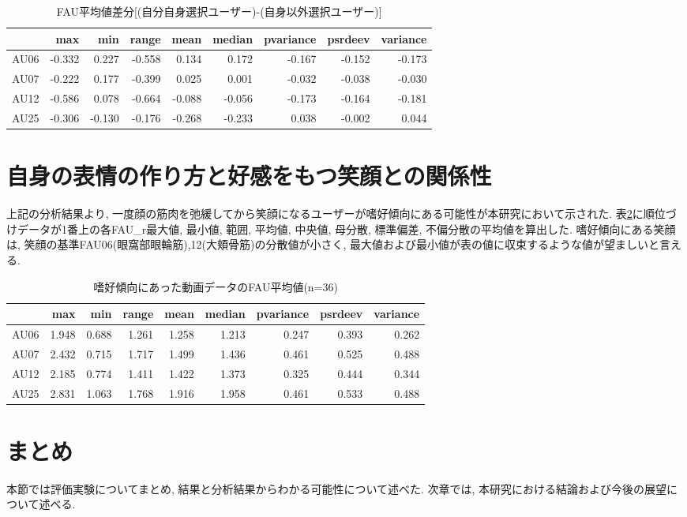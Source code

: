\begin{table}[htb]
  \caption{FAU平均値差分[(自分自身選択ユーザー)-(自身以外選択ユーザー)]}
  \label{tb:mean_differences}
  \begin{center}
  \begin{tabular}{|l||r|r|r|r|r|r|r|r|} \hline
    &max	&min	&range	&mean	&median	&pvariance	&psrdeev	&variance \\ \hline \hline
  AU06	&-0.332 	&0.227 	&-0.558 	&0.134 	&0.172 	&-0.167 	&-0.152 	&-0.173   \\ \hline
  AU07	&-0.222 	&0.177 	&-0.399 	&0.025 	&0.001 	&-0.032 	&-0.038 	&-0.030   \\ \hline
  AU12	&-0.586 	&0.078 	&-0.664 	&-0.088 	&-0.056 	&-0.173 	&-0.164 	&-0.181   \\ \hline
  AU25	&-0.306 	&-0.130 	&-0.176 	&-0.268 	&-0.233 	&0.038 	&-0.002 	&0.044   \\ \hline
  \end{tabular}
  \end{center}
\end{table}


\section{自身の表情の作り方と好感をもつ笑顔との関係性}
上記の分析結果より, 一度顔の筋肉を弛緩してから笑顔になるユーザーが嗜好傾向にある可能性が本研究において示された.
表\ref{tb:prefer_fau}に順位づけデータが1番上の各FAU\_r最大値, 最小値, 範囲, 平均値, 中央値,
母分散, 標準偏差, 不偏分散の平均値を算出した.
嗜好傾向にある笑顔は, 笑顔の基準FAU06(眼窩部眼輪筋),12(大頬骨筋)の分散値が小さく,
最大値および最小値が表の値に収束するような値が望ましいと言える.

\begin{table}[htb]
  \caption{嗜好傾向にあった動画データのFAU平均値(n=36)}
  \label{tb:prefer_fau}
  \begin{center}
  \begin{tabular}{|l||r|r|r|r|r|r|r|r|} \hline
    &max	&min	&range	&mean	&median	&pvariance	&psrdeev	&variance \\ \hline \hline
  AU06	&1.948	&0.688	&1.261	&1.258	&1.213	&0.247	&0.393	&0.262   \\ \hline
  AU07	&2.432	&0.715	&1.717	&1.499	&1.436	&0.461	&0.525	&0.488   \\ \hline
  AU12	&2.185	&0.774	&1.411	&1.422	&1.373	&0.325	&0.444	&0.344   \\ \hline
  AU25	&2.831	&1.063	&1.768	&1.916	&1.958	&0.461	&0.533	&0.488   \\ \hline
  \end{tabular}
  \end{center}
\end{table}

\section{まとめ}
本節では評価実験についてまとめ, 結果と分析結果からわかる可能性について述べた.
次章では, 本研究における結論および今後の展望について述べる.
